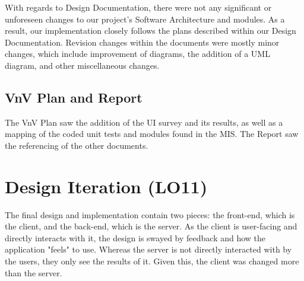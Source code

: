 \documentclass{article}
\begin{document}
With regards to Design Documentation, there were not any significant or unforeseen changes to our project's Software Architecture and modules. As a result, our implementation closely follows the plans described within our Design Documentation. Revision changes within the documents were mostly minor changes, which include improvement of diagrams, the addition of a UML diagram, and other miscellaneous changes.

\subsection{VnV Plan and Report}
The VnV Plan saw the addition of the UI survey and its results, as well as a mapping of the coded unit tests and modules found in the MIS. The Report saw 
the referencing of the other documents.

\section{Design Iteration (LO11)}

\noindent The final design and implementation contain two pieces: the front-end, which is the client, and the back-end, which is the server. As the client is user-facing and directly interacts with it, the design is swayed by feedback and how the application "feels" to use. Whereas the server is not directly interacted with by the users, they only see the results of it. Given this, the client was changed more than the server.
\end{document}
